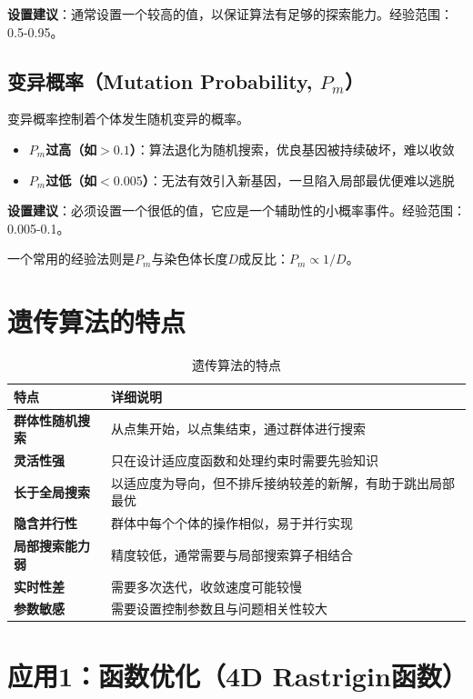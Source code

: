 \textbf{设置建议}：通常设置一个较高的值，以保证算法有足够的探索能力。经验范围：0.5-0.95。

\subsection{变异概率（Mutation Probability, $P_m$）}

变异概率控制着个体发生随机变异的概率。

\begin{itemize}
    \item \textbf{$P_m$过高（如$>0.1$）}：算法退化为随机搜索，优良基因被持续破坏，难以收敛
    \item \textbf{$P_m$过低（如$<0.005$）}：无法有效引入新基因，一旦陷入局部最优便难以逃脱
\end{itemize}

\textbf{设置建议}：必须设置一个很低的值，它应是一个辅助性的小概率事件。经验范围：0.005-0.1。

一个常用的经验法则是$P_m$与染色体长度$D$成反比：$P_m \propto 1/D$。

\section{遗传算法的特点}

\begin{table}[H]
\centering
\caption{遗传算法的特点}
\begin{tabular}{p{}p{}}
\toprule
\textbf{特点} & \textbf{详细说明} \\
\midrule
\textbf{群体性随机搜索} & 从点集开始，以点集结束，通过群体进行搜索 \\
\hline
\textbf{灵活性强} & 只在设计适应度函数和处理约束时需要先验知识 \\
\hline
\textbf{长于全局搜索} & 以适应度为导向，但不排斥接纳较差的新解，有助于跳出局部最优 \\
\hline
\textbf{隐含并行性} & 群体中每个个体的操作相似，易于并行实现 \\
\hline
\textbf{局部搜索能力弱} & 精度较低，通常需要与局部搜索算子相结合 \\
\hline
\textbf{实时性差} & 需要多次迭代，收敛速度可能较慢 \\
\hline
\textbf{参数敏感} & 需要设置控制参数且与问题相关性较大 \\
\bottomrule
\end{tabular}
\end{table}

\section{应用1：函数优化（4D Rastrigin函数）}

